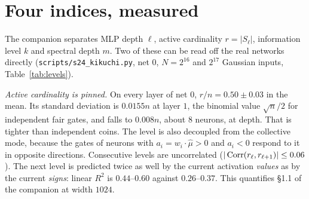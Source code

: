 \begin{abstract}
This note is written against the companion \emph{Weighted activation graphs and certified approximation}
(10 October 2026). It does three things. (i) Every finite claim of the companion was re-derived and checked
independently (ten checks, exact rationals where finite; all pass). Its wall formula $\mu=\sum_e S_e j_e$ is
re-proved in a Stein form, $\E F=\E\,\Delta F$, which shows that the layerwise Gaussian closure is \emph{exactly} the
mean-field version of the wall sum. (ii) For the physical wall graph we prove the one-particle upper bound
$\gap\le 1/\lambda_{\max}(\Gamma^{-1/2}\cov(g)\,\Gamma^{-1/2})$, where $g$ is the gate vector and $\Gamma$ the diagonal of
one-way wall fluxes. Numerically the bound is attained to within $0.5\%$ on every Gaussian sign law tested, and exactly
on the companion's own crowded-sector family. Its obstruction in \S6.1 is therefore a statement about the top eigenvalue
of the gate covariance. (iii) At width $1024$ on the official networks we measure the quantities that the companion's
remaining theorem depends on. These are the active-cardinality and excitation levels, the wall rates, the
spectral-independence radius, cross-depth gate dependence, the wall-chain gaps, and the visible spectrum of the terminal
ellipsoid with the location of first-pass errors in it.
\end{abstract}

\maketitle

\section{Four indices, measured}\label{sec:levels}

The companion separates MLP depth $\ell$, active cardinality $r=|S_\ell|$, information level $k$ and spectral depth $m$.
Two of these can be read off the real networks directly (\texttt{scripts/s24\_kikuchi.py}, net 0, $N=2^{16}$ and $2^{17}$
Gaussian inputs, Table~\ref{tab:levels}).

\emph{Active cardinality is pinned.} On every layer of net 0, $r/n=0.50\pm0.03$ in the mean. Its standard deviation is
$0.0155n$ at layer $1$, the binomial value $\sqrt{n}/2$ for independent fair gates, and falls to $0.008n$, about $8$
neurons, at depth. That is tighter than independent coins. The level is also decoupled from the collective mode, because
the gates of neurons with $a_i=w_i\cdot\hat\mu>0$ and $a_i<0$ respond to it in opposite directions. Consecutive levels are
uncorrelated ($|\operatorname{Corr}(r_\ell,r_{\ell+1})|\le0.06$). The next level is predicted twice as well by the current activation
\emph{values} as by the current \emph{signs}: linear $R^2$ is $0.44$--$0.60$ against $0.26$--$0.37$. This quantifies
\S1.1 of the companion at width $1024$.

